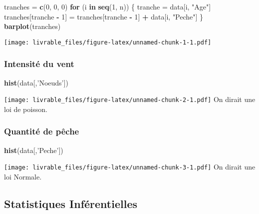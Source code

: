 \documentclass[]{article}
\newenvironment{Shaded}{\begin{snugshade}}{\end{snugshade}}
\newcommand{\KeywordTok}[1]{\textcolor[rgb]{0.13,0.29,0.53}{\textbf{#1}}}
\newcommand{\DecValTok}[1]{\textcolor[rgb]{0.00,0.00,0.81}{#1}}
\newcommand{\StringTok}[1]{\textcolor[rgb]{0.31,0.60,0.02}{#1}}
\newcommand{\ControlFlowTok}[1]{\textcolor[rgb]{0.13,0.29,0.53}{\textbf{#1}}}
\newcommand{\OperatorTok}[1]{\textcolor[rgb]{0.81,0.36,0.00}{\textbf{#1}}}
\newcommand{\NormalTok}[1]{#1}
\begin{document}
\begin{Shaded}
\begin{Highlighting}[]
\NormalTok{tranches =}\StringTok{ }\KeywordTok{c}\NormalTok{(}\DecValTok{0}\NormalTok{, }\DecValTok{0}\NormalTok{, }\DecValTok{0}\NormalTok{)}
\ControlFlowTok{for}\NormalTok{ (i }\ControlFlowTok{in} \KeywordTok{seq}\NormalTok{(}\DecValTok{1}\NormalTok{, n)) \{}
\NormalTok{    tranche =}\StringTok{ }\NormalTok{data[i, }\StringTok{"Age"}\NormalTok{]}
\NormalTok{    tranches[tranche }\OperatorTok{-}\StringTok{ }\DecValTok{1}\NormalTok{] =}\StringTok{ }\NormalTok{tranches[tranche }\OperatorTok{-}\StringTok{ }\DecValTok{1}\NormalTok{] }\OperatorTok{+}\StringTok{ }\NormalTok{data[i, }\StringTok{"Peche"}\NormalTok{]}
\NormalTok{\}}
\KeywordTok{barplot}\NormalTok{(tranches)}
\end{Highlighting}
\end{Shaded}

\texttt{[image: livrable\_files/figure-latex/unnamed-chunk-1-1.pdf]}

\subsubsection{Intensité du vent}\label{intensite-du-vent}

\begin{Shaded}
\begin{Highlighting}[]
\KeywordTok{hist}\NormalTok{(data[,}\StringTok{'Noeuds'}\NormalTok{])}
\end{Highlighting}
\end{Shaded}

\texttt{[image: livrable\_files/figure-latex/unnamed-chunk-2-1.pdf]} On
dirait une loi de poisson.

\subsubsection{Quantité de pêche}\label{quantite-de-peche}

\begin{Shaded}
\begin{Highlighting}[]
\KeywordTok{hist}\NormalTok{(data[,}\StringTok{'Peche'}\NormalTok{])}
\end{Highlighting}
\end{Shaded}

\texttt{[image: livrable\_files/figure-latex/unnamed-chunk-3-1.pdf]} On
dirait une loi Normale.

\subsection{Statistiques
Inférentielles}\label{statistiques-inferentielles}
\end{document}
